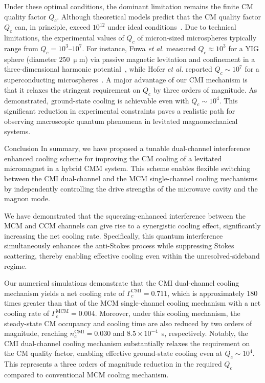 \documentclass[aps, prresearch, reprint, nofootinbib, longbibliography]{revtex4-2}
\makeatletter
\renewcommand{\thesection}{\Alph{section}}%
\renewcommand{\section}{%
		\secdef{\@Appendix}{\@sAppendix}%
	}%
\newcommand{\@Appendix}[2][?]{%
		\refstepcounter{section}%
		\vspace{0.5em}
		{\centering\large\bfseries Appendix \thesection: #2\par}%
		\addcontentsline{toc}{section}{Appendix \thesection}%
		\markright{Appendix \thesection}%
	}%
\makeatother
\begin{document}
Under these optimal conditions, the dominant limitation remains the finite CM quality factor $Q_c$.
Although theoretical models predict that the CM quality factor $Q_c $
can, in principle, exceed $10^{12}$ under ideal conditions~\cite{12}. %
Due to technical limitations, the experimental values of $Q_c$ of micron-sized microspheres typically range from
$Q_c = 10^3$--$10^7$. For instance, Fuwa \emph{et al.} measured \( Q_c \approx 10^3 \) for a YIG sphere (diameter \( 250~\mathrm{\upmu m}\)) via passive magnetic levitation and confinement in a three-dimensional harmonic potential~\cite{PhysRevA.108.063511}, while Hofer \textit{et al.} reported \( Q_c \sim 10^7 \) for a superconducting microspheres~\cite{PhysRevLett.131.043603}.
A major advantage of our CMI mechanism is that it relaxes the stringent requirement on $Q_c$ by three orders of magnitude.
As demonstrated, ground-state cooling is achievable even with
$Q_c \sim 10^4$. 
This significant reduction in experimental constraints paves a realistic path for observing macroscopic quantum phenomena in levitated magnomechanical systems.














\section{Conclusion}
\label{VIII}
In summary,
we have proposed a tunable dual-channel interference enhanced  cooling scheme for improving the CM cooling of a levitated micromagnet in a hybrid CMM system.
This scheme enables flexible switching between the CMI dual-channel and the MCM single-channel cooling mechanisms by independently controlling the drive strengths of the microwave cavity and the magnon mode.


We have demonstrated that the squeezing-enhanced interference between the MCM and CCM channels can give rise to a synergistic cooling effect, significantly increasing the net cooling rate. Specifically, this quantum interference simultaneously enhances the anti-Stokes process while suppressing Stokes scattering, thereby enabling effective cooling even within the unresolved-sideband regime.

Our numerical simulations demonstrate that the CMI dual-channel cooling mechanism yields a net cooling rate of $\Gamma_{c}^{\mathrm{CMI}} = 0.711$, which is approximately 180 times greater than that of the MCM single-channel cooling mechanism with a net cooling rate of $\Gamma_c^{\mathrm{MCM}} = 0.004$.
Moreover, under this cooling mechanism, the steady-state CM occupancy and cooling time are also reduced by two orders of magnitude, reaching $n_c^{\mathrm{CMI}} = 0.030$ and $8.5 \times 10^{-4}$~s, respectively.
Notably, the CMI dual-channel cooling mechanism substantially relaxes the requirement on the CM quality factor, enabling effective ground-state cooling even at $Q_c \sim 10^4$.
This represents a three orders of magnitude reduction in the required
$Q_c$ compared to conventional MCM cooling mechanism.
\end{document}
